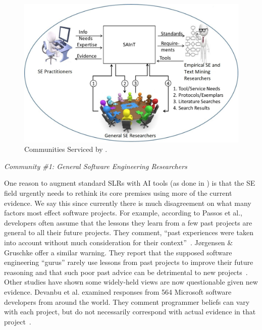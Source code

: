 \begin{figure}[!t]
	\centering
	\includegraphics[width=4.5in]{ResearchEnabled}
	\caption{Communities Serviced by {\IT}.}
	\label{figure-ResearchEnabled}
\end{figure}
\item {\em Community \#1: General Software Engineering Researchers}
 

 One reason to augment standard SLRs with AI tools (as done in {\IT}) is that the SE field urgently  needs to rethink its core premises using more of the current evidence.
We say this since currently there is much
disagreement on what many factors most effect software projects.
For example, according to Passos et al.,  developers often assume that the lessons they learn from a few past projects are general to all their future projects. 
They comment, ``past experiences were taken into account without much consideration for their context''~\cite{Pa11}. 
 J{\o}rgensen \& Gruschke offer a similar warning. 
They report that the supposed software engineering ``gurus'' rarely use lessons from past projects to improve their future reasoning and that such poor past advice can be detrimental to new projects~\cite{Jo09}.
 Other studies have shown some widely-held views are now questionable given new evidence.
	Devanbu et al. examined responses from 564 Microsoft software developers from around
	the world. 
	They comment programmer beliefs can vary with each project, but do not necessarily correspond with actual evidence in that project~\cite{De16}. 

